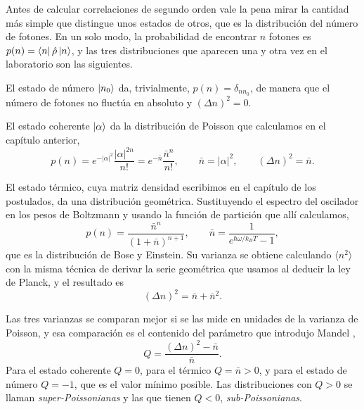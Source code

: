     Antes de calcular correlaciones de segundo orden vale la pena mirar la cantidad más simple que distingue unos estados de otros, que es la distribución del número de fotones. En un solo modo, la probabilidad de encontrar $n$ fotones es $p(n) = \bra{n}\hat{\rho}\ket{n}$, y las tres distribuciones que aparecen una y otra vez en el laboratorio son las siguientes.

    El estado de número $\ket{n_{0}}$ da, trivialmente, $p(n) = \delta_{n n_{0}}$, de manera que el número de fotones no fluctúa en absoluto y $\left(\Delta n\right)^{2} = 0$.

    El estado coherente $\ket{\alpha}$ da la distribución de Poisson que calculamos en el capítulo anterior,
    \begin{equation}\label{eq:PoissonCoh}
        p(n) = e^{-|\alpha|^{2}}\frac{|\alpha|^{2n}}{n!} = e^{-\bar{n}}\frac{\bar{n}^{n}}{n!},
        \qquad
        \bar{n} = |\alpha|^{2},
        \qquad
        \left(\Delta n\right)^{2} = \bar{n} .
    \end{equation}

    El estado térmico, cuya matriz densidad escribimos en el capítulo de los postulados, da una distribución geométrica. Sustituyendo el espectro del oscilador en los pesos de Boltzmann y usando la función de partición que allí calculamos,
    \begin{equation}\label{eq:BoseEinstein}
        p(n) = \frac{\bar{n}^{n}}{\left(1+\bar{n}\right)^{n+1}},
        \qquad
        \bar{n} = \frac{1}{e^{\hbar\omega/k_{B}T}-1},
    \end{equation}
    que es la distribución de Bose y Einstein. Su varianza se obtiene calculando $\langle n^{2}\rangle$ con la misma técnica de derivar la serie geométrica que usamos al deducir la ley de Planck, y el resultado es
    \begin{equation}\label{eq:VarianzaTermica}
        \left(\Delta n\right)^{2} = \bar{n} + \bar{n}^{2} .
    \end{equation}

    Las tres varianzas se comparan mejor si se las mide en unidades de la varianza de Poisson, y esa comparación es el contenido del parámetro que introdujo Mandel \citep{mandel1979sub},
    \begin{equation}\label{eq:MandelQ}
        Q = \frac{\left(\Delta n\right)^{2} - \bar{n}}{\bar{n}} .
    \end{equation}
    Para el estado coherente $Q=0$, para el térmico $Q = \bar{n} > 0$, y para el estado de número $Q = -1$, que es el valor mínimo posible. Las distribuciones con $Q>0$ se llaman \textit{super-Poissonianas} y las que tienen $Q<0$, \textit{sub-Poissonianas}.

